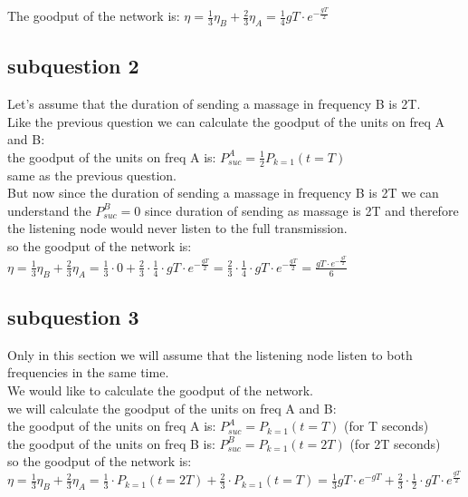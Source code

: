 \documentclass{article}
\begin{document}
The goodput of the network is: $\eta =\frac13 \eta_B  +\frac23 \eta_A = \frac14 gT\cdot e^{-\frac{gT}{2}}$

\subsection{subquestion 2}
Let's assume that the duration of sending a massage in frequency B is 2T.\\
Like the previous question we can calculate the goodput of the units on freq A and B:\\
the goodput of the units on freq A is: $P^A_{suc} = \frac12 P_{k=1}(t=T)$\\ same as the previous question.\\
But now since the duration of sending a massage in frequency B is 2T we can understand the $P^B_{suc} = 0$ since duration of sending as massage is 2T and therefore the listening node would never listen to the full transmission.\\
so the goodput of the network is: $\eta =\frac13 \eta_B  +\frac23 \eta_A = \frac13 \cdot 0 + \frac23 \cdot \frac14 \cdot gT\cdot e^{-\frac{gT}{2}} = \frac23 \cdot \frac14 \cdot gT\cdot e^{-\frac{gT}{2}} = \frac{{gT}\cdot e^{-\frac{gT}{2}}}{6}$

\subsection{subquestion 3}
Only in this section we will assume that the listening node listen to both frequencies in the same time.\\
We would like to calculate the goodput of the network.\\
we will calculate the goodput of the units on freq A and B:\\
the goodput of the units on freq A is: $P^A_{suc} = P_{k=1}(t=T)$ (for T seconds)\\
the goodput of the units on freq B is: $P^B_{suc} = P_{k=1}(t=2T)$ (for 2T seconds)\\
so the goodput of the network is: $\eta =\frac13 \eta_B  +\frac23 \eta_A = \frac13 \cdot P_{k=1}(t=2T) + \frac23 \cdot P_{k=1}(t=T) = \frac13 gT \cdot e^{-gT} + \frac23 \cdot \frac{1}{2} \cdot gT \cdot e^{\frac{gT}{2}}  $
\end{document}
